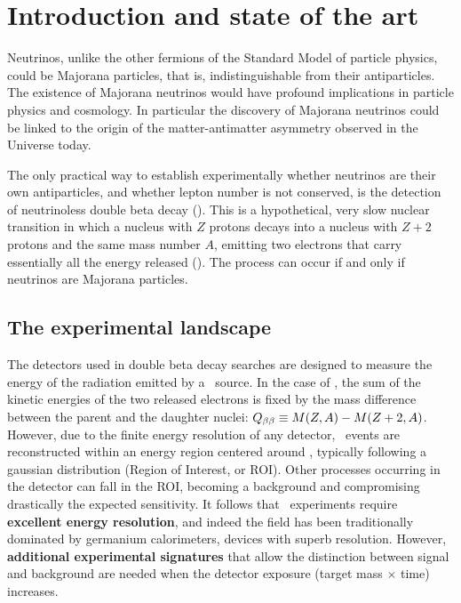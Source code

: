 \section*{Introduction and state of the art}
Neutrinos, unlike the other fermions of the Standard Model of particle physics, could be Majorana particles, that is, indistinguishable from their antiparticles. The existence of Majorana neutrinos would have profound implications in particle physics and cosmology. In particular 
the discovery of Majorana neutrinos could be linked to the origin of the matter-antimatter asymmetry observed in the Universe today. 

The only practical way to establish experimentally whether neutrinos are their own antiparticles, and whether lepton number is not conserved, is the detection of neutrinoless double beta decay (\bbonu). This is a hypothetical, very slow nuclear transition in which a nucleus with $Z$ protons decays into a nucleus with $Z+2$ protons and the same mass number $A$, emitting two electrons that carry essentially all the energy released (\Qbb). The process can occur if and only if neutrinos are Majorana particles. 

\subsection*{The experimental landscape}
The detectors used in double beta decay searches are designed to measure the energy of the radiation emitted by a \bb\ source. In the case of \bbonu, the sum of the kinetic energies of the two released electrons is fixed by the mass difference between the parent and the daughter nuclei: $Q_{\beta\beta} \equiv M(Z,A)-M(Z+2,A)$. However, due to the finite energy resolution of any detector, \bbonu\ events are reconstructed within an energy region centered around \Qbb, typically following a gaussian distribution (Region of Interest, or ROI). Other processes occurring in the detector can fall in the ROI, becoming a background and compromising drastically the expected sensitivity. It follows that \bbonu\ experiments require {\bf excellent energy resolution}, and indeed the field has been traditionally dominated by germanium calorimeters, devices with superb resolution. However, {\bf additional experimental signatures} that allow the distinction between signal and background are needed when the detector exposure (target mass $\times$ time) increases. 
 
